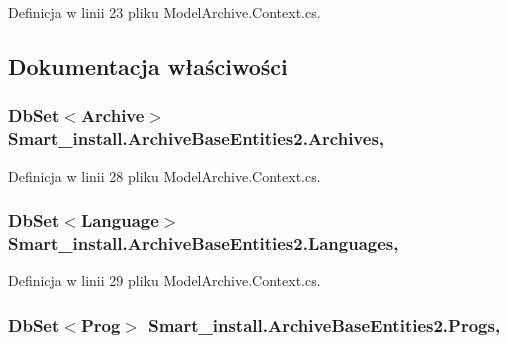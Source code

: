 Definicja w linii 23 pliku Model\+Archive.\+Context.\+cs.



\subsection{Dokumentacja właściwości}
\hypertarget{class_smart__install_1_1_archive_base_entities2_a405bbf0b59d84859ee55e7667f9914eb}{
\subsubsection[{Archives}]{\setlength{\rightskip}{0pt plus 5cm}Db\+Set$<${\bf Archive}$>$ Smart\+\_\+install.\+Archive\+Base\+Entities2.\+Archives\hspace{0.3cm}{\ttfamily [get]}, {\ttfamily [set]}}}\label{class_smart__install_1_1_archive_base_entities2_a405bbf0b59d84859ee55e7667f9914eb}


Definicja w linii 28 pliku Model\+Archive.\+Context.\+cs.

\hypertarget{class_smart__install_1_1_archive_base_entities2_aa44a1546a9fbf51f1c599f772e8a1aa3}{
\subsubsection[{Languages}]{\setlength{\rightskip}{0pt plus 5cm}Db\+Set$<${\bf Language}$>$ Smart\+\_\+install.\+Archive\+Base\+Entities2.\+Languages\hspace{0.3cm}{\ttfamily [get]}, {\ttfamily [set]}}}\label{class_smart__install_1_1_archive_base_entities2_aa44a1546a9fbf51f1c599f772e8a1aa3}


Definicja w linii 29 pliku Model\+Archive.\+Context.\+cs.

\hypertarget{class_smart__install_1_1_archive_base_entities2_a70a23976dcecf46e3f71b19e6a02a723}{
\subsubsection[{Progs}]{\setlength{\rightskip}{0pt plus 5cm}Db\+Set$<${\bf Prog}$>$ Smart\+\_\+install.\+Archive\+Base\+Entities2.\+Progs\hspace{0.3cm}{\ttfamily [get]}, {\ttfamily [set]}}}\label{class_smart__install_1_1_archive_base_entities2_a70a23976dcecf46e3f71b19e6a02a723}


